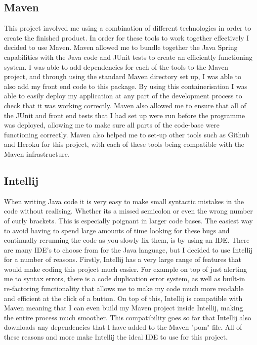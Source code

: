 \subsection{Maven \label{maven}}

This project involved me using a combination of different technologies in order to create the finished product. In order for these tools to work together effectively I decided to use Maven. Maven allowed me to bundle together the Java Spring capabilities with the Java code and JUnit tests to create an efficiently functioning system. I was able to add dependencies for each of the tools to the Maven project, and through using the standard Maven directory set up, I was able to also add my front end code to this package. By using this containerisation I was able to easily deploy my application at any part of the development process to check that it was working correctly. Maven also allowed me to ensure that all of the JUnit and front end tests that I had set up were run before the programme was deployed, allowing me to make sure all parts of the code-base were functioning correctly. Maven also helped me to set-up other tools such as Github and Heroku for this project, with each of these tools being compatible with the Maven infrastructure.

\subsection{Intellij \label{intellij}}

When writing Java code it is very easy to make small syntactic mistakes in the code without realising. Whether its a missed semicolon or even the wrong number of curly brackets. This is especially poignant in larger code bases. The easiest way to avoid having to spend large amounts of time looking for these bugs and continually rerunning the code as you slowly fix them, is by using an IDE. There are many IDE's to choose from for the Java language, but I decided to use Intellij for a number of reasons. Firstly, Intellij has a very large range of features that would make coding this project much easier. For example on top of just alerting me to syntax errors, there is a code duplication error system, as well as built-in re-factoring functionality that allows me to make my code much more readable and efficient at the click of a button. On top of this, Intellij is compatible with Maven meaning that I can even build my Maven project inside Intellij, making the entire process much smoother. This compatibility goes so far that Intellij also downloads any dependencies that I have added to the Maven "pom" file. All of these reasons and more make Intellij the ideal IDE to use for this project.

